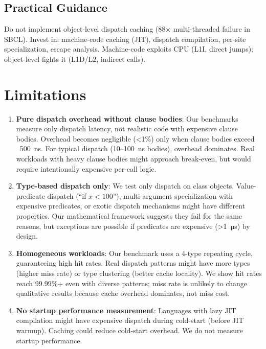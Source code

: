 \documentclass[sigplan,final,acmsmall,review,screen]{acmart}
\begin{document}
\subsection{Practical Guidance}

Do not implement object-level dispatch caching (88× multi-threaded failure in SBCL). Invest in: machine-code caching (JIT), dispatch compilation, per-site specialization, escape analysis. Machine-code exploits CPU (L1I, direct jumps); object-level fights it (L1D/L2, indirect calls).

\section{Limitations}

\begin{enumerate}
  \item \textbf{Pure dispatch overhead without clause bodies}: Our benchmarks measure only dispatch latency, not realistic code with
    expensive clause bodies. Overhead becomes negligible (<1\%) only when clause bodies exceed ~500~ns. For typical dispatch (10--100~ns bodies), overhead dominates. Real workloads with heavy clause bodies might approach break-even, but would require intentionally expensive per-call logic.

  \item \textbf{Type-based dispatch only}: We test only dispatch on class objects. Value-predicate dispatch (``if $x < 100$''), multi-argument specialization with expensive predicates, or exotic dispatch mechanisms might have different properties. Our mathematical framework suggests they fail for the same reasons, but exceptions are possible if predicates are expensive (>1~µs) by design.

  \item \textbf{Homogeneous workloads}: Our benchmark uses a 4-type repeating cycle, guaranteeing high hit rates. Real dispatch patterns might have more types (higher miss rate) or type clustering (better cache locality). We show hit rates reach 99.99\%+ even with diverse patterns; miss rate is unlikely to change qualitative results because cache overhead dominates, not miss cost.

  \item \textbf{No startup performance measurement}: Languages with lazy JIT compilation might have expensive dispatch during cold-start (before JIT warmup). Caching could reduce cold-start overhead. We do not measure startup performance.


\end{enumerate}
\end{document}
